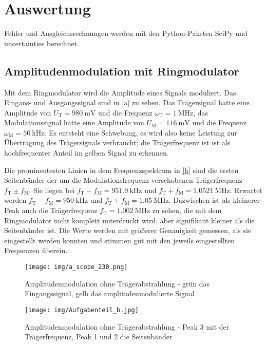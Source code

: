 \section{Auswertung}

Fehler und Ausgleichsrechnungen werden mit den Python-Paketen SciPy \cite{scipy} und uncertainties \cite{uncertain} berechnet.

\subsection{Amplitudenmodulation mit Ringmodulator}

Mit dem Ringmodulator wird die Amplitude eines Signals moduliert. Das Eingans- und Ausgangssignal sind in \autoref{a} zu sehen. Das Trägersignal hatte eine Amplitude von $U_\text{T}=\SI{980}{\milli\volt}$ und die Frequenz $\omega_\text{T}=\SI{1}{\mega\hertz}$, das Modulationssignal hatte eine Amplitude von $U_\text{M}=\SI{116}{\milli\volt}$ und die Frequenz $\omega_\text{M}=\SI{50}{\kilo\hertz}$. Es entsteht eine Schwebung, es wird also keine Leistung zur Übertragung des Trägersignals verbraucht; die Trägerfrequenz ist ist als hochfrequenter Anteil im gelben Signal zu erkennen. \par

\indent Die prominentesten Linien in dem Frequenzspektrum in \autoref{b} sind die ersten Seitenbänder der um die Modulationsfrequenz verschobenen Trägerfrequenz $f_\text{T} \pm f_\text{M}$. Sie liegen bei $f_\text{T} - f_\text{M} = \SI{951.9}{\kilo\hertz}$ und $f_\text{T} + f_\text{M} = \SI{1.0521}{\mega\hertz}$. Erwartet werden $f_\text{T} - f_\text{M} = \SI{950}{\kilo\hertz}$ und $f_\text{T} + f_\text{M} = \SI{1.05}{\mega\hertz}$. Dazwischen ist als kleinerer Peak auch die Trägerfrequenz $f_\text{T} = \SI{1.002}{\mega\hertz}$ zu sehen, die mit dem Ringmodulator nicht komplett unterdrückt wird, aber signifikant kleiner als die Seitenbänder ist. Die Werte werden mit größerer Genauigkeit gemessen, als sie eingestellt werden konnten und stimmen gut mit den jeweils eingestellten Frequenzen überein. \par

\begin{figure}
	\centering
	\texttt{[image: img/a\_scope\_230.png]}
	\caption{Amplitudenmodulation ohne Trägerabstrahlung - grün das Eingangssignal, gelb das amplitudenmodulierte Signal}
	\label{a}
\end{figure}

\begin{figure}
	\centering
	\texttt{[image: img/Aufgabenteil\_b.jpg]}
	\caption{Amplitudenmodulation ohne Trägerabstrahlung - Peak 3 mit der Trägerfrequenz, Peak 1 und 2 die Seitenbänder}
	\label{b}
\end{figure}

